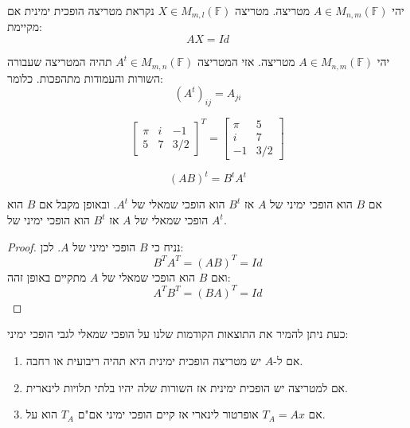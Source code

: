 \documentclass{tstextbook}
\begin{document}
\begin{definition}
יהי \(A \in M_{n,m}\left( \mathbb{F}  \right)\) מטריצה. מטריצה \(X \in M_{m,l}\left( \mathbb{F}  \right)\) נקראת מטריצה הופכית ימינית אם מקיימת:
$$AX=Id$$

\end{definition}
\begin{definition}
יהי \(A\in M_{n,m}\left( \mathbb{F}  \right)\) מטריצה. אזי המטריצה \(A^{t}\in M_{m,n}\left( \mathbb{F}  \right)\) תהיה המטריצה שעבורה השורות והעמודות מתהפכות. כלומר:
$$(A^{t})_{ij}=A_{ji}$$

\end{definition}
\begin{example}
$$\begin{bmatrix}\pi&i&-1\\ 5&7&3/2\end{bmatrix}^{T}=\begin{bmatrix}\pi&5\\ i&7\\ -1&3/2\end{bmatrix}$$

\end{example}
\begin{proposition}
$$(AB)^{t}=B^{t}A^{t}$$

\end{proposition}
\begin{proposition}
אם \(B\) הוא הופכי ימיני של \(A\) אז \(B^{t}\) הוא הופכי שמאלי של \(A^{t}\). ובאופן מקבל אם \(B\) הוא הופכי שמאלי של \(A\) אז \(B^{t}\) הוא הופכי ימיני של \(A^{t}\).

\end{proposition}
\begin{proof}
נניח כי \(B\) הופכי ימיני של \(A\). לכן:
$$B^{T}A^{T}=(A B)^{T}=Id$$
ואם \(B\) הוא הופכי שמאלי של \(A\) מתקיים באופן זהה:
$$A^{T}B^{T}=(BA)^{T}=Id$$

\end{proof}
כעת ניתן להמיר את התוצאות הקודמות שלנו על הופכי שמאלי לגבי הופכי ימיני:

\begin{proposition}
  \begin{enumerate}
    \item אם ל-\(A\) יש מטריצה הופכית ימינית היא תהיה ריבועית או רחבה. 


    \item אם למטריצה יש הופכית ימינית אז השורות שלה יהיו בלתי תלויות לינארית. 


    \item אם \(T_{A}=Ax\) אופרטור לינארי אז קיים הופכי ימיני אם"ם \(T_{A}\) הוא על. 


  \end{enumerate}
\end{proposition}
\end{document}
